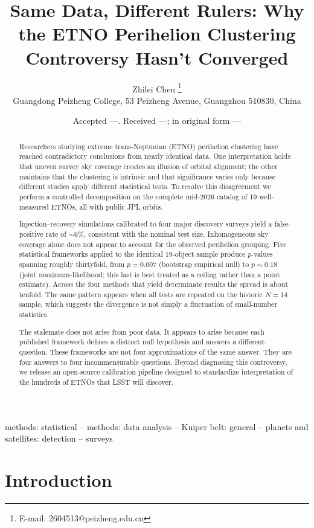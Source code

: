 \documentclass[usenatbib]{mnras}
\title{Same Data, Different Rulers: Why the ETNO Perihelion Clustering Controversy Hasn't Converged}
\author[Zhilei Chen]{Zhilei Chen%
\thanks{E-mail: 2604513@peizheng.edu.cn}%
\\
Guangdong Peizheng College, 53 Peizheng Avenue, Guangzhou 510830, China}
\date{Accepted ---. Received ---; in original form ---}
\begin{document}
\maketitle

\begin{abstract}
Researchers studying extreme trans-Neptunian (ETNO) perihelion clustering have reached contradictory conclusions from nearly identical data. One interpretation holds that uneven survey sky coverage creates an illusion of orbital alignment; the other maintains that the clustering is intrinsic and that significance varies only because different studies apply different statistical tests. To resolve this disagreement we perform a controlled decomposition on the complete mid-2026 catalog of 19 well-measured ETNOs, all with public JPL orbits.

Injection--recovery simulations calibrated to four major discovery surveys yield a false-positive rate of $\sim$6\%, consistent with the nominal test size. Inhomogeneous sky coverage alone does not appear to account for the observed perihelion grouping. Five statistical frameworks applied to the identical 19-object sample produce $p$-values spanning roughly thirtyfold, from $p=0.007$ (bootstrap empirical null) to $p\sim0.18$ (joint maximum-likelihood; this last is best treated as a ceiling rather than a point estimate). Across the four methods that yield determinate results the spread is about tenfold. The same pattern appears when all tests are repeated on the historic $N=14$ sample, which suggests the divergence is not simply a fluctuation of small-number statistics.

The stalemate does not arise from poor data. It appears to arise because each published framework defines a distinct null hypothesis and answers a different question. These frameworks are not four approximations of the same answer. They are four answers to four incommensurable questions. Beyond diagnosing this controversy, we release an open-source calibration pipeline designed to standardize interpretation of the hundreds of ETNOs that LSST will discover.
\end{abstract}

\begin{keywords}
methods: statistical -- methods: data analysis -- Kuiper belt: general -- planets and satellites: detection -- surveys
\end{keywords}

\section{Introduction}
\end{document}
